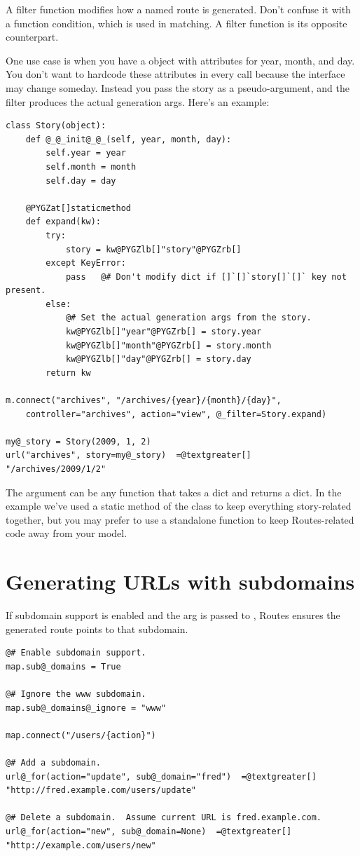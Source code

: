 \documentclass[letterpaper,10pt,english]{manual}
\begin{document}
A filter function modifies how a named route is generated.  Don't confuse it
with a function condition, which is used in matching.  A filter function is its
opposite counterpart.

One use case is when you have a  object with attributes for year,
month, and day.  You don't want to hardcode these attributes in every 
call because the interface may change someday.  Instead you pass the story as a
pseudo-argument, and the filter produces the actual generation args.  Here's an
example:

\begin{Verbatim}[commandchars=@\[\]]
class Story(object):
    def @_@_init@_@_(self, year, month, day):
        self.year = year
        self.month = month
        self.day = day

    @PYGZat[]staticmethod
    def expand(kw):
        try:
            story = kw@PYGZlb[]"story"@PYGZrb[]
        except KeyError:
            pass   @# Don't modify dict if []`[]`story[]`[]` key not present.
        else:
            @# Set the actual generation args from the story.
            kw@PYGZlb[]"year"@PYGZrb[] = story.year
            kw@PYGZlb[]"month"@PYGZrb[] = story.month
            kw@PYGZlb[]"day"@PYGZrb[] = story.day
        return kw

m.connect("archives", "/archives/{year}/{month}/{day}",
    controller="archives", action="view", @_filter=Story.expand)

my@_story = Story(2009, 1, 2)
url("archives", story=my@_story)  =@textgreater[]  "/archives/2009/1/2"
\end{Verbatim}

The  argument can be any function that takes a dict and returns a
dict.  In the example we've used a static method of the  class to keep
everything story-related together, but you may prefer to use a standalone
function to keep Routes-related code away from your model.


\section{Generating URLs with subdomains}

If subdomain support is enabled and the  arg is passed to
, Routes ensures the generated route points to that subdomain.

\begin{Verbatim}[commandchars=@\[\]]
@# Enable subdomain support.
map.sub@_domains = True

@# Ignore the www subdomain.
map.sub@_domains@_ignore = "www"

map.connect("/users/{action}")

@# Add a subdomain.
url@_for(action="update", sub@_domain="fred")  =@textgreater[]  "http://fred.example.com/users/update"

@# Delete a subdomain.  Assume current URL is fred.example.com.
url@_for(action="new", sub@_domain=None)  =@textgreater[]  "http://example.com/users/new"
\end{Verbatim}
\end{document}
